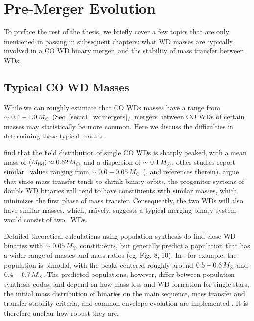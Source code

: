 \section{Pre-Merger Evolution}

To preface the rest of the thesis, we briefly cover a few topics that are only mentioned in passing in subsequent chapters: what WD masses are typically involved in a CO WD binary merger, and the stability of mass transfer between WDs.

\subsection{Typical CO WD Masses}
\label{ssec:c1_cowd_massrange}

While we can roughly estimate that CO WDs masses have a range from $\sim0.4 - 1.0\,\Msun$ (Sec. \ref{sec:c1_wdmergers}), mergers between CO WDs of certain masses may statistically be more common.  Here we discuss the difficulties in determining these typical masses.

\cite{trem+16} find that the field distribution of single CO WDs is sharply peaked, with a mean mass of $\Mmean \approx 0.62\,\Msun$ and a dispersion of $\sim0.1\,\Msun$; other studies report similar \Mmean\ values ranging from $\sim0.6 - 0.65\,\Msun$ (\citealt{klei+13}, and references therein).  \citeal{vkercj10} argue that since mass transfer tends to shrink binary orbits, the progenitor systems of double WD binaries will tend to have constituents with similar masses, which minimizes the first phase of mass transfer.  Consequently, the two WDs will also have similar masses, which, na\"{i}vely, suggests a typical merging binary system would consist of two \Mmean\ WDs.

Detailed theoretical calculations using population synthesis do find close WD binaries with $\sim0.65\,\Msun$ constituents, but generally predict a population that has a wider range of masses and mass ratios (eg. \citealt{toon+14} Fig. 8, 10).  In \cite{toonnp12}, for example, the population is bimodal, with the peaks centered roughly around $0.5-0.6\,\Msun$ and $0.4-0.7\,\Msun$.  The predicted populations, however, differ between population synthesis codes, and depend on how mass loss and WD formation for single stars, the initial mass distribution of binaries on the main sequence, mass transfer and transfer stability criteria, and common envelope evolution are implemented \citep{toon+14, clae+14}.  It is therefore unclear how robust they are.

